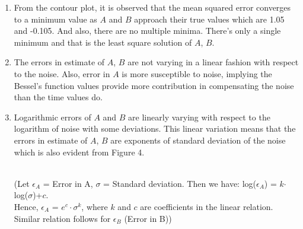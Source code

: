 \documentclass[12pt, a4paper]{report}
\begin{document}
\begin{enumerate}
    \item From the contour plot, it is observed that the mean squared error converges to a 
    minimum value as $A$ and $B$ approach their true values which are 1.05 and -0.105. And
    also, there are no multiple minima. There's only a single minimum and that is the least square solution of $A$, $B$. 
    \item The errors in estimate of $A$, $B$ are not varying in a linear fashion with respect to the noise. Also, error in $A$ is more susceptible to noise, implying the Bessel's function values provide more contribution in compensating the noise than the time values do. 
    \item Logarithmic errors of $A$ and $B$ are linearly varying with respect to the logarithm of noise with some deviations. This linear variation means that the errors in estimate of $A$, $B$ are exponents of standard deviation of the noise which is also evident from Figure 4.
    
    \\(Let $\epsilon_{A}$ = Error in A, $\sigma$ = Standard deviation. Then we have:
    log($\epsilon_{A}$) = $k$$\cdot$log($\sigma$)+$c$. 
    \\Hence, $\epsilon_{A}$ = $e^{c}\cdot{\sigma^k}$, where $k$ and $c$ are coefficients
    in the linear relation. Similar relation follows for $\epsilon_{B}$ (Error in B))
\end{enumerate}
\end{document}
